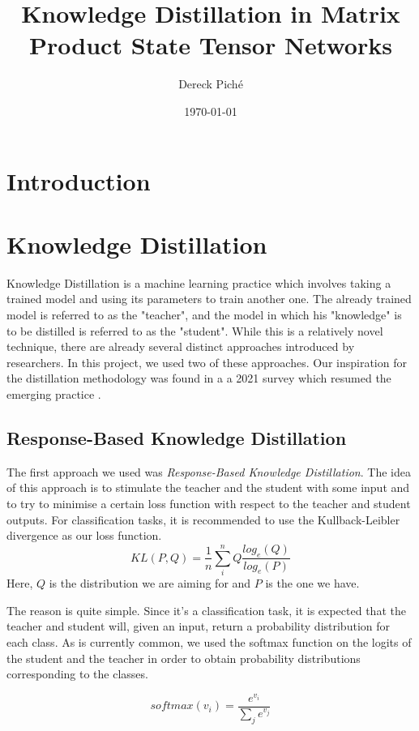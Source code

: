 \documentclass{article}
\title{Knowledge Distillation in Matrix Product State Tensor Networks}
\author{Dereck Piché}
\date{\today}
\theoremstyle{definition}
\theoremstyle{definition}
\begin{document}
\maketitle


\section{Introduction}



\section{Knowledge Distillation}
Knowledge Distillation is a machine learning practice which involves
taking a trained model and using its parameters to train another one.
The already trained model is referred to as the "teacher", and 
the model in which his "knowledge" is to be distilled is referred to as
the "student". While this is a relatively novel technique, there are 
already several distinct approaches introduced by researchers.
In this project, we used two of these approaches. Our inspiration for the distillation 
methodology was found in a a 2021 survey which resumed the emerging 
practice \cite{Gou_2021}.

\subsection{Response-Based Knowledge Distillation}
The first approach we used was \emph{Response-Based Knowledge Distillation}. The idea of this approach is to stimulate the teacher and the student with some input and to try to minimise a certain loss function with respect to the teacher and student outputs. For classification tasks, it is recommended to use the Kullback-Leibler divergence as our loss function. 
\begin{equation}
    KL(P, Q) = \frac{1}{n} \sum_i^n Q \frac{log_e(Q)}{log_e(P)}
\end{equation}
Here, $Q$ is the distribution we are aiming for and $P$ is the one we have.

The reason is quite simple. Since it's a classification task, it is expected that the teacher and student will, given an input, return a probability distribution for each class. As is currently common, we used the softmax function on the logits of the student and the teacher in order to obtain probability distributions corresponding to the classes. 

\begin{equation}
    softmax(v_i) = \frac{e^{v_i}}{\sum_{j}{e^{v_j}}}
\end{equation}
\end{document}
